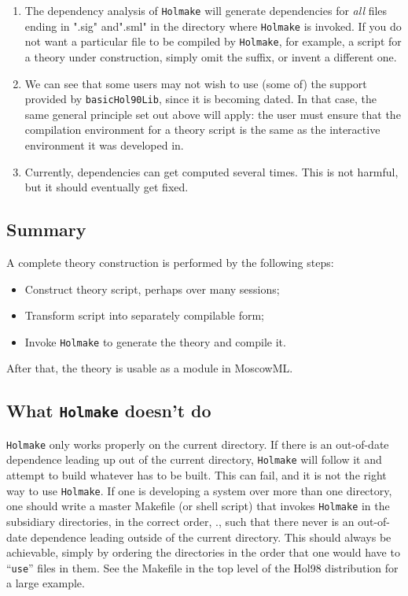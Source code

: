 \documentclass[12pt,fleqn,layout,a4paper]{report}
\begin{document}
\begin{enumerate}
\item The dependency analysis of {\tt Holmake} will generate dependencies for
{\it all\/} files ending in ".sig" and".sml" in the directory where
{\tt Holmake} is invoked. If you do not want a particular file to be compiled
by {\tt Holmake}, for example, a script for a theory under construction,
simply omit the suffix, or invent a different one.


\item We can see that some users may not wish to use (some of) the
support provided by \verb+basicHol90Lib+, since it is becoming dated. In
that case, the same general principle set out above will apply: the user
must ensure that the compilation environment for a theory script is the
same as the interactive environment it was developed in.

\item Currently, dependencies can get computed several times. This is
not harmful, but it should eventually get fixed.

\end{enumerate}


\subsection{Summary}

A complete theory construction is performed by the following steps:
\begin{itemize}
\item Construct theory script, perhaps over many sessions;
\item Transform script into separately compilable form;
\item Invoke {\tt Holmake} to generate the theory and compile it.
\end{itemize}

After that, the theory is usable as a module in MoscowML.


\subsection{What {\tt Holmake} doesn't do}

{\tt Holmake} only works properly on the current directory. If there is an
out-of-date dependence leading up out of the current directory, {\tt Holmake}
will follow it and attempt to build whatever has to be built. This can
fail, and it is not the right way to use {\tt Holmake}.  If one is developing
a system over more than one directory, one should write a master
Makefile (or shell script) that invokes {\tt Holmake} in the subsidiary
directories, in the correct order, \ie., such that there never is an
out-of-date dependence leading outside of the current directory. This
should always be achievable, simply by ordering the directories in the
order that one would have to ``\verb+use+'' files in them. See the
Makefile in the top level of the Hol98 distribution for a large example.
\end{document}
